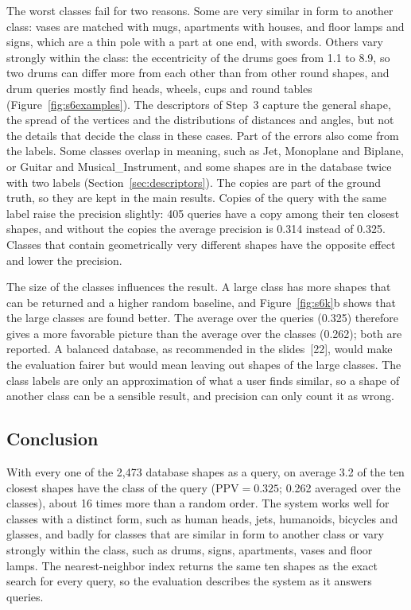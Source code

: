 \documentclass[10pt,a4paper]{article}
\begin{document}
The worst classes fail for two reasons. Some are very similar in form to another class: vases are matched with mugs, apartments
with houses, and floor lamps and signs, which are a thin pole with a part at one end, with swords. Others vary strongly within
the class: the eccentricity of the drums goes from 1.1 to 8.9, so two drums can differ more from each other than from other round
shapes, and drum queries mostly find heads, wheels, cups and round tables (Figure~\ref{fig:s6examples}). The descriptors of Step~3 capture the general shape, the spread of the vertices and the
distributions of distances and angles, but not the details that decide the class in these cases. Part of the errors also come
from the labels. Some classes overlap in meaning, such as Jet, Monoplane and Biplane, or Guitar and Musical\_Instrument, and some
shapes are in the database twice with two labels (Section~\ref{sec:descriptors}). The copies are part of the ground truth, so
they are kept in the main results. Copies of the query with the same label raise the precision slightly: 405 queries have a copy
among their ten closest shapes, and without the copies the average precision is 0.314 instead of 0.325. Classes that
contain geometrically very different shapes have the opposite effect and lower the precision.

The size of the classes influences the result. A large class has more shapes that can be returned and a higher random baseline,
and Figure~\ref{fig:s6k}b shows that the large classes are found better. The average over the queries (0.325) therefore gives a
more favorable picture than the average over the classes (0.262); both are reported. A balanced database, as recommended in the
slides~[22], would make the evaluation fairer but would mean leaving out shapes of the large classes. The class labels are only an
approximation of what a user finds similar, so a shape of another class can be a sensible result, and precision can only count it
as wrong.

\subsection{Conclusion}
With every one of the 2,473 database shapes as a query, on average 3.2 of the ten closest shapes have the class of the query
($\mathrm{PPV}=0.325$; 0.262 averaged over the classes), about 16 times more than a random order. The system works well for
classes with a distinct form, such as human heads, jets, humanoids, bicycles and glasses, and badly for classes that are
similar in form to another class or vary strongly within the class, such as drums, signs, apartments, vases and floor lamps. The
nearest-neighbor index returns the same ten shapes as the exact search for every query, so the evaluation describes the system as
it answers queries.
\end{document}
